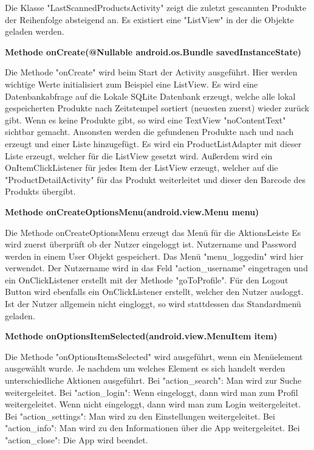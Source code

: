 \documentclass{scrartcl}
\begin{document}
Die Klasse "LastScannedProductsActivity" zeigt die zuletzt gescannten Produkte der Reihenfolge absteigend an. Es existiert eine "ListView" in der die Objekte geladen werden. \newline

\noindent\textbf{Methode onCreate(@Nullable android.os.Bundle savedInstanceState)}

\noindent Die Methode "onCreate" wird beim Start der Activity ausgeführt. Hier werden wichtige Werte initialisiert zum Beispiel eine ListView. Es wird eine Datenbankabfrage auf die Lokale SQLite Datenbank erzeugt, welche alle lokal gespeicherten Produkte nach Zeitstempel sortiert (neuesten zuerst) wieder zurück gibt. Wenn es keine Produkte gibt, so wird eine TextView "noContentText" sichtbar gemacht. Ansonsten werden die gefundenen Produkte nach und nach erzeugt und einer Liste hinzugefügt. Es wird ein ProductListAdapter mit dieser Liste erzeugt, welcher für die ListView gesetzt wird. Außerdem wird ein OnItemClickListener für jedes Item der ListView erzeugt, welcher auf die "ProductDetailActivity" für das Produkt weiterleitet und dieser den Barcode des Produkts übergibt. \newline

\noindent\textbf{Methode onCreateOptionsMenu(android.view.Menu menu)}

\noindent Die Methode onCreateOptionsMenu erzeugt das Menü für die AktionsLeiste Es wird zuerst überprüft ob der Nutzer eingeloggt ist. Nutzername und Password werden in einem User Objekt gespeichert. Das Menü "menu\_loggedin" wird hier verwendet. Der Nutzername wird in das Feld "action\_username" eingetragen und ein OnClickListener erstellt mit der Methode "goToProfile". Für den Logout Button wird ebenfalls ein OnClickListener erstellt, welcher den Nutzer ausloggt. Ist der Nutzer allgemein nicht eingloggt, so wird stattdessen das Standardmenü geladen. \newline

\noindent\textbf{Methode onOptionsItemSelected(android.view.MenuItem item)} 

\noindent Die Methode "onOptionsItemsSelected" wird ausgeführt, wenn ein Menüelement ausgewählt wurde. Je nachdem um welches Element es sich handelt werden unterschiedliche Aktionen ausgeführt. Bei "action\_search": Man wird zur Suche weitergeleitet. Bei "action\_login": Wenn eingeloggt, dann wird man zum Profil weitergeleitet. Wenn nicht eingeloggt, dann wird man zum Login weitergeleitet. Bei "action\_settings": Man wird zu den Einstellungen weitergeleitet. Bei "action\_info": Man wird zu den Informationen über die App weitergeleitet. Bei "action\_close": Die App wird beendet. \newline
\end{document}
